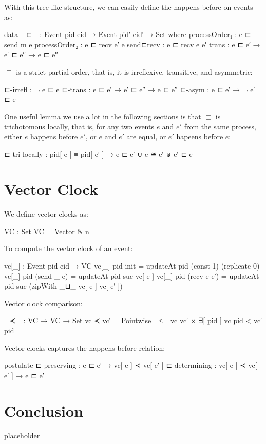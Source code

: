 \documentclass[acmsmall,review,anonymous]{acmart}
\theoremstyle{definition}
\theoremstyle{theorem}
\begin{document}
With this tree-like structure, we can easily define the happens-before
on events as:
\begin{code}
data _⊏_ : Event pid eid → Event pid′ eid′ → Set where
  processOrder₁  : e ⊏ send m e
  processOrder₂  : e ⊏ recv e′ e
  send⊏recv      : e ⊏ recv e  e′
  trans          : e ⊏ e′ → e′ ⊏ e″ → e ⊏ e″
\end{code}

$\sqsubset$ is a strict partial order, that is, it is irreflexive,
transitive, and asymmetric:
\begin{code}
⊏-irrefl : ¬ e ⊏ e
⊏-trans : e ⊏ e′ → e′ ⊏ e″ → e ⊏ e″
⊏-asym : e ⊏ e′ → ¬ e′ ⊏ e
\end{code}

One useful lemma we use a lot in the following sections is that $\sqsubset$ is trichotomous locally, that is, for any two events $e$ and $e'$ from the same process, either $e$ happens before $e'$, or $e$ and $e'$ are equal, or $e'$ hapeens before $e$:
\begin{code}
⊏-tri-locally : pid[ e ] ≡ pid[ e′ ] → e ⊏ e′ ⊎ e ≅ e′ ⊎ e′ ⊏ e
\end{code}

\section{Vector Clock}
We define vector clocks as:
\begin{code}
VC : Set
VC = Vector ℕ n
\end{code}

To compute the vector clock of an event:
\begin{code}
vc[_] : Event pid eid → VC
vc[_] {pid} init        = updateAt pid (const 1) (replicate 0)
vc[_] {pid} (send _ e)  = updateAt pid suc vc[ e ]
vc[_] {pid} (recv e e′) = updateAt pid suc (zipWith _⊔_ vc[ e ] vc[ e′ ])
\end{code}

Vector clock comparison:
\begin{code}
_≺_ : VC → VC → Set
vc ≺ vc′ = Pointwise _≤_ vc vc′ × ∃[ pid ] vc pid < vc′ pid
\end{code}

Vector clocks captures the happens-before relation:
\begin{code}
postulate
  ⊏-preserving : e ⊏ e′ →  vc[ e ] ≺ vc[ e′ ]
  ⊏-determining : vc[ e ] ≺ vc[ e′ ] → e ⊏ e′
\end{code}

\section{Conclusion}
placeholder~\citep{mattern-vector-time, fidge-vector-time, schmuck-dissertation}
\end{document}
